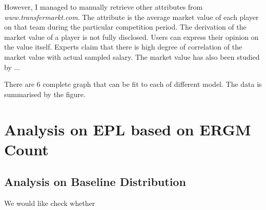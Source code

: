 \documentclass[12pt,a4paper,twoside,openany]{book}
\begin{document}
However, I managed to manually retrieve other attributes from \textit{www.transfermarkt.com}.
The attribute is the average market value of each player on that team during the particular competition period. 
The derivation of the market value of a player is not fully disclosed.
Users can express their opinion on the value itself.
Experts claim that there is high degree of correlation of the market value with actual sampled salary.
The market value has also been studied by ...

There are 6 complete graph that can be fit to each of different model. The data is summarised by the figure.

\section{Analysis on EPL based on ERGM Count}
\subsection{Analysis on Baseline Distribution}
We would like check whether 
{}

\end{document}
